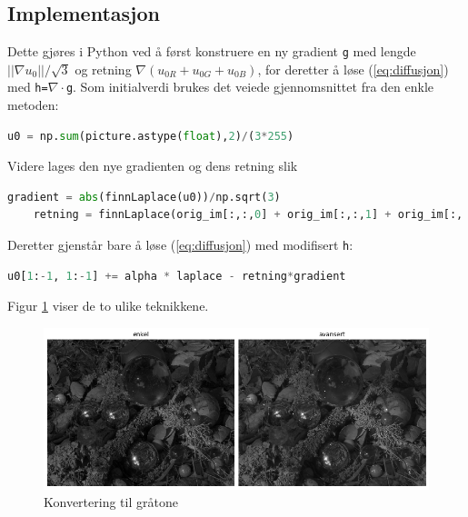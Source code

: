 \subsection{Implementasjon}
Dette gjøres i Python ved å først konstruere en ny gradient \texttt{g} med lengde $||\nabla u_0||/\sqrt{3}$ og retning $\nabla(u_{0R} + u_{0G} + u_{0B})$, for deretter å løse (\ref{eq:diffusjon}) med \texttt{h=$\nabla \cdot$g}.
\newline Som initialverdi brukes det veiede gjennomsnittet fra den enkle metoden:
\begin{lstlisting}[language=Python]
    u0 = np.sum(picture.astype(float),2)/(3*255)
\end{lstlisting}
Videre lages den nye gradienten og dens retning slik
\begin{lstlisting}[language=Python]
    gradient = abs(finnLaplace(u0))/np.sqrt(3)
    retning = finnLaplace(orig_im[:,:,0] + orig_im[:,:,1] + orig_im[:,:,2])
\end{lstlisting}
Deretter gjenstår bare å løse (\ref{eq:diffusjon}) med modifisert \texttt{h}:
\begin{lstlisting}[language=Python]
    u0[1:-1, 1:-1] += alpha * laplace - retning*gradient
\end{lstlisting}
Figur \ref{fig:graytone} viser de to ulike teknikkene.
\begin{figure}
\begin{center}
    \includegraphics[width=1\columnwidth]{bilder/konvert.png}
    \caption{Konvertering til gråtone
    \label{fig:graytone}} 
\end{center}
\end{figure}



